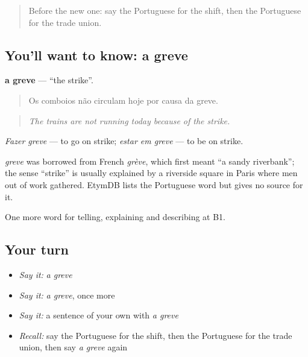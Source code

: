 \begin{quote}
Before the new one: say the Portuguese for the shift, then the Portuguese for the trade union.
\end{quote}

\subsection*{You'll want to know: a greve}
\textbf{a greve} — \textquotedblleft{}the strike\textquotedblright{}.

\begin{quote}
Os comboios não circulam hoje por causa da greve.
\end{quote}

\begin{quote}
\emph{The trains are not running today because of the strike.}
\end{quote}

\emph{Fazer greve} — to go on strike; \emph{estar em greve} — to be on strike.

\begin{cousinweb}
\emph{greve} was borrowed from French \emph{grève}, which first meant \textquotedblleft{}a sandy riverbank\textquotedblright{}; the sense \textquotedblleft{}strike\textquotedblright{} is usually explained by a riverside square in Paris where men out of work gathered. EtymDB lists the Portuguese word but gives no source for it.
\end{cousinweb}

\begin{grammarlens}[title={What you've built}]
One more word for telling, explaining and describing at B1.
\end{grammarlens}

\subsection*{Your turn}
\begin{itemize}
\raggedright
  \item \emph{Say it:} \emph{a greve}
  \item \emph{Say it:} \emph{a greve}, once more
  \item \emph{Say it:} a sentence of your own with \emph{a greve}
  \item \emph{Recall:} say the Portuguese for the shift, then the Portuguese for the trade union, then say \emph{a greve} again
\end{itemize}

